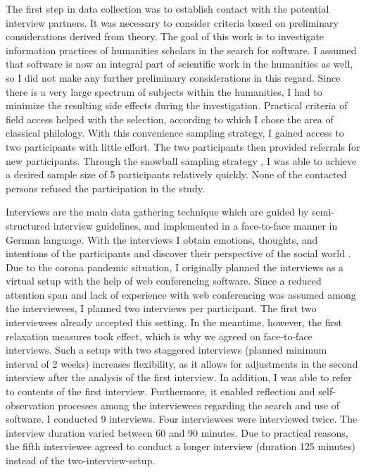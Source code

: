 \documentclass[12pt, a4paper, titlepage, oneside, abstract=true, toc=listof, toc=bibliography, BCOR=1cm]{scrreprt}
\begin{document}
The first step in data collection was to establish contact with the potential interview partners. It was necessary to consider criteria based on preliminary considerations derived from theory. The goal of this work is to investigate information practices of humanities scholars in the search for software. I assumed that software is now an integral part of scientific work in the humanities as well, so I did not make any further preliminary considerations in this regard. Since there is a very large spectrum of subjects within the humanities, I had to minimize the resulting side effects during the investigation. Practical criteria of field access helped with the selection, according to which I chose the area of classical philology. With this convenience sampling strategy, I gained access to two participants with little effort. The two participants then provided referrals for new participants. Through the snowball sampling strategy \citep{Biernacki1981}, I was able to achieve a desired sample size of 5 participants relatively quickly. None of the contacted persons refused the participation in the study.

Interviews are the main data gathering technique which are guided by semi-structured interview guidelines, and implemented in a face-to-face manner \citep{Bryman2004} in German language. With the interviews I obtain emotions, thoughts, and intentions of the participants and discover their perspective of the social world \citep{Patton2002}. Due to the corona pandemic situation, I originally planned the interviews as a virtual setup with the help of web conferencing software. Since a reduced attention span and lack of experience with web conferencing was assumed among the interviewees, I planned two interviews per participant. The first two interviewees already accepted this setting. In the meantime, however, the first relaxation measures took effect, which is why we agreed on face-to-face interviews. Such a setup with two staggered interviews (planned minimum interval of 2 weeks) increases flexibility, as it allows for adjustments in the second interview after the analysis of the first interview. In addition, I was able to refer to contents of the first interview. Furthermore, it enabled reflection and self-observation processes among the interviewees regarding the search and use of software. I conducted 9 interviews. Four interviewees were interviewed twice. The interview duration varied between 60 and 90 minutes. Due to practical reasons, the fifth interviewee agreed to conduct a longer interview (duration 125 minutes) instead of the two-interview-setup.
\end{document}

